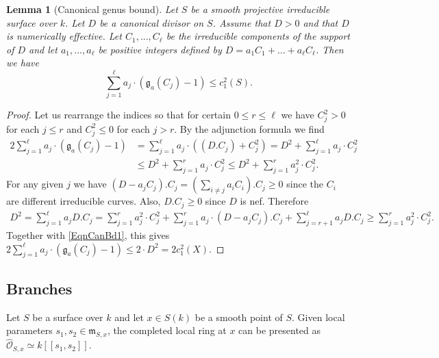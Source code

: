 \documentclass[11pt]{amsart}
\newtheorem{lemma}[theorem]{Lemma}
\theoremstyle{remark}
\numberwithin{equation}{section}
\newcommand{\gfrak}{\mathfrak{g}}
\newcommand{\mfrak}{\mathfrak{m}}
\newcommand{\Ocal}{\mathscr{O}}
\begin{document}
\begin{lemma}[Canonical genus bound] \label{LemmaCanonicalGenusBd} Let $S$ be a smooth projective irreducible surface over $k$. Let $D$ be a canonical divisor on $S$. Assume that $D>0$ and that $D$ is numerically effective. Let $C_1,...,C_\ell$ be the irreducible components of the support of $D$ and let $a_1,...,a_\ell$ be positive integers defined by $D=a_1C_1 +...+a_\ell C_\ell$. Then we have
$$
\sum_{j=1}^\ell a_j\cdot (\gfrak_a(C_j)-1)\le c_1^2(S).
$$
\end{lemma}
\begin{proof} Let us rearrange the indices so that for certain $0\le r\le \ell$ we have $C_j^2>0$ for each $j\le r$ and $C_j^2\le 0$ for each $j>r$. By the adjunction formula we find
\begin{equation} \label{EqnCanBd1} 
\begin{aligned}
2\sum_{j=1}^\ell a_j\cdot (\gfrak_a(C_j)-1)&=\sum_{j=1}^\ell a_j\cdot ((D.C_j) +C_j^2) = D^2 + \sum_{j=1}^\ell a_j\cdot  C_j^2\\
&\le D^2 + \sum_{j=1}^r a_j \cdot C_j^2 \le D^2 + \sum_{j=1}^r a_j^2 \cdot C_j^2.
\end{aligned}
\end{equation}
For any given $j$ we have $(D-a_jC_j).C_j=(\sum_{i\ne j} a_iC_i).C_j\ge 0$ since the $C_i$ are different irreducible curves. Also, $D.C_j\ge 0$ since $D$ is nef. Therefore
$$
\begin{aligned}
D^2=\sum_{j=1}^\ell a_j D.C_j = \sum_{j=1}^r a_j^2 \cdot C_j^2 + \sum_{j=1}^r  a_j\cdot (D-a_jC_j).C_j + \sum_{j=r+1}^\ell a_j D.C_j\ge \sum_{j=1}^r a_j^2 \cdot C_j^2 .
\end{aligned}
$$
Together with \eqref{EqnCanBd1}, this gives $2\sum_{j=1}^\ell a_j\cdot (\gfrak_a(C_j)-1)\le 2\cdot D^2=2c_1^2(X)$.
\end{proof}


\subsection{Branches} Let $S$ be a surface over $k$ and let $x\in S(k)$ be a smooth point of $S$. Given local parameters $s_1,s_2\in \mfrak_{S,x}$, the completed local ring at $x$ can be presented as $\widehat{\Ocal}_{S,x}\simeq  k[[s_1,s_2]]$.
\end{document}
